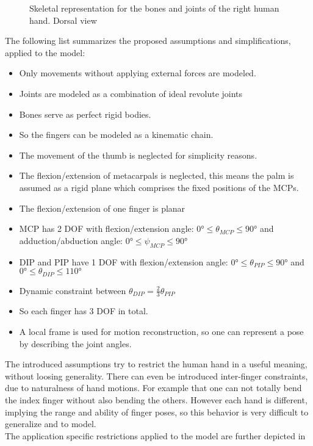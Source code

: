 \begin{figure}[h]
\centering
	\hfill
\caption{Skeletal representation for the bones and joints of the right human hand. Dorsal view \cite{bullock2012assessing}}
\label{fig:skeletHand}
\end{figure}

The following list summarizes the proposed assumptions and simplifications, applied to the model:
\begin{itemize}
\item Only movements without applying external forces are modeled.
\item Joints are modeled as a combination of ideal revolute joints
\item Bones serve as perfect rigid bodies.
\item So the fingers can be modeled as a kinematic chain.
\item The movement of the thumb is neglected for simplicity reasons.
\item The flexion/extension of metacarpals is neglected, this means the palm is assumed as a rigid plane which comprises the fixed positions of the \acp{MCP}.
\item The flexion/extension of one finger is planar
\item \ac{MCP} has 2 \ac{DOF} with flexion/extension angle: $ \ang{0} \leq \theta_{MCP} \leq \ang{90} $ and adduction/abduction angle: $ \ang{0} \leq \psi_{MCP} \leq \ang{90} $
\item \ac{DIP} and \ac{PIP} have 1 DOF with flexion/extension angle: $ \ang{0} \leq \theta_{PIP} \leq \ang{90} $ and $ \ang{0} \leq \theta_{DIP} \leq \ang{110} $
\item Dynamic constraint between $ \theta_{DIP} = \frac{2}{3} \theta_{PIP} $
\item So each finger has 3 \ac{DOF} in total.
\item A local frame is used for motion reconstruction, so one can represent a pose by describing the joint angles.
\end{itemize}

The introduced assumptions try to restrict the human hand in a useful meaning, without loosing generality. There can even be introduced inter-finger constraints, due to naturalness of hand motions. For example that one can not totally bend the index finger without also bending the others. However each hand is different, implying the range and ability of finger poses, so this behavior is very difficult to generalize and to model.\\
The application specific restrictions applied to the model are further depicted in 




